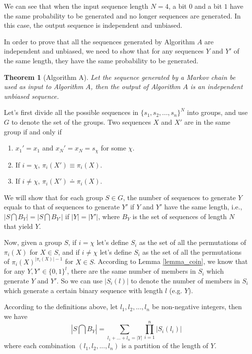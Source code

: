 \documentclass[journal]{IEEEtran}
\newtheorem{Theorem}{Theorem}
\def\tmu{\doteq}
\def\pmu{\equiv}
\begin{document}
We can see that when the input sequence length $N=4$, a bit $0$ and a bit $1$ have the same probability to be generated and no longer sequences are generated.
In this case, the output sequence is independent and unbiased.

In order to prove that  all the sequences generated by Algorithm $A$ are independent and unbiased, we need to show that for any sequences $Y$ and $Y'$ of the same length, they have the same probability to be generated.

\begin{Theorem}[Algorithm A]
Let the sequence
generated by a Markov chain be used as input to Algorithm $A$, then the
output of Algorithm $A$ is an independent unbiased sequence.\label{theorem_AlgorithmA}
\end{Theorem}

\proof Let's first divide all the possible sequences in $\{s_1,s_2,...,s_n\}^N$ into groups, and use $G$ to denote the set of the groups. Two sequences $X$ and $X'$
are in the same group if and only if
\begin{enumerate}
  \item $x_1'=x_1$ and $x_N'=x_N=s_\chi$ for some $\chi$.
  \item If $i=\chi$, $\pi_i(X')\pmu \pi_i(X)$.
  \item If $i\neq \chi$, $\pi_i(X')\tmu \pi_i(X)$.
\end{enumerate}
We will show that for each group $S\in G$, the number of sequences to generate $Y$ equals to that of sequences to generate $Y'$ if $Y$ and $Y'$ have the same length, i.e., $|S\bigcap B_Y|=|S\bigcap B_{Y'}|$
if $|Y|=|Y'|$, where $B_Y$ is the set of sequences of length $N$ that yield $Y$.

Now, given a group $S$, if $i=\chi$ let's define $S_i$ as the set of
all the permutations of $\pi_i(X)$ for $X\in S$, and if $i\neq \chi$ let's define $S_i$ as the set of all the permutations of $\pi_i(X)^{|\pi_i(X)|-1}$ for $X\in S$. According to Lemma \ref{lemma_coin}, we know that for any $Y,Y'\in \{0,1\}^{l}$,
there are  the same number of members in $S_i$ which generate $Y$ and $Y'$. So we can use
$|S_i(l)|$ to denote the number of members in $S_i$ which generate a certain binary sequence with length $l$ (e.g. $Y$).

According to the definitions above, let $l_1,l_2,...,l_n$ be non-negative integers, then we have
$$|S\bigcap B_Y|=\sum_{l_1+...+l_n=|Y|}\prod_{i=1}^n|S_i(l_i)|$$
where each combination $(l_1,l_2,...,l_n)$ is a partition of the length of $Y$.
\end{document}

